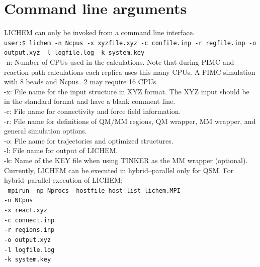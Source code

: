\documentclass[12pt]{report}
\begin{document}
\section{Command line arguments}

LICHEM can only be invoked from a command line interface. \\

\texttt{user:\$ lichem -n Ncpus -x xyzfile.xyz -c confile.inp
-r regfile.inp -o output.xyz -l logfile.log -k system.key} \\

-n: Number of CPUs used in the calculations.
Note that during PIMC and reaction path calculations each replica uses this
many CPUs.
A PIMC simulation with 8 beads and Ncpus=2 may require 16 CPUs. \\

-x: File name for the input structure in XYZ format.
The XYZ input should be in the standard format and have a blank comment
line. \\

-c: File name for connectivity and force field information. \\

-r: File name for definitions of QM/MM regions, QM wrapper, MM wrapper,
and general simulation options. \\

-o: File name for trajectories and optimized structures.\\

-l: File name for output of LICHEM.\\

-k: Name of the KEY file when using TINKER as the MM wrapper (optional).\\

Currently, LICHEM can be executed in hybrid--parallel only for QSM.
For hybrid--parallel execution of LICHEM;\\

\texttt{
\hspace{0.35in} mpirun -np Nprocs --hostfile host_list
lichem.MPI \\
\hspace*{1.1in} -n NCpus \\
\hspace*{1.1in} -x react.xyz \\
\hspace*{1.1in} -c connect.inp \\
\hspace*{1.1in} -r regions.inp \\
\hspace*{1.1in} -o output.xyz \\
\hspace*{1.1in} -l logfile.log \\
\hspace*{1.1in} -k system.key
}\\
\end{document}
